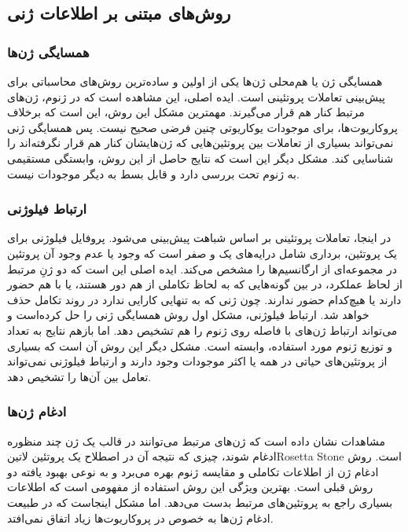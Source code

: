 \subsection{روش‌های مبتنی بر اطلاعات ژنی}
\subsubsection{همسایگی ژن‌ها}
همسایگی ژن یا هم‌محلی ژن‌ها یکی از اولین و ساده‌ترین روش‌های محاسباتی برای پیش‌بینی تعاملات پروتئینی است. ایده اصلی، این مشاهده است که در ژنوم، ژن‌های مرتبط کنار هم قرار می‌گیرند. مهمترین مشکل این روش، این است که برخلاف پروکاریوت‌ها، برای موجودات یوکاریوتی چنین فرضی صحیح نیست. پس همسایگی ژنی نمی‌تواند بسیاری از تعاملات بین پروتئین‌هایی که ژن‌هایشان کنار هم قرار نگرفته‌اند را شناسایی کند. مشکل دیگر این است که نتایج حاصل از این روش، وابستگی مستقیمی به ژنوم تحت بررسی دارد و قابل بسط به دیگر موجودات نیست.

\subsubsection{ارتباط فیلوژنی}
در اینجا، تعاملات پروتئینی بر اساس شباهت  پیش‌بینی می‌شود. پروفایل فیلوژنی برای یک پروتئین، برداری شامل درایه‌های یک و صفر است که وجود یا عدم وجود آن پروتئین در مجموعه‌ای از ارگانسیم‌ها را مشخص می‌کند. ایده اصلی این است که دو ژنِ مرتبط از لحاظ عملکرد، در بین گونه‌هایی که به لحاظ تکاملی از هم دور هستند، یا با هم حضور دارند یا هیچ‌کدام حضور ندارند. چون ژنی که به تنهایی کارایی ندارد در روند تکامل حذف خواهد شد. ارتباط فیلوژنی، مشکل اول روش همسایگی ژنی را حل کرده‌است و می‌تواند ارتباط ژن‌های با فاصله روی ژنوم را هم تشخیص دهد. اما بازهم نتایج به تعداد و توزیع ژنوم مورد استفاده، وابسته است. مشکل دیگر این روش آن است که بسیاری از پروتئین‌های حیاتی در همه یا اکثر موجودات وجود دارند و ارتباط فیلوژنی نمی‌تواند تعامل بین آن‌ها را تشخیص دهد.

\subsubsection{ادغام ژن‌ها}
مشاهدات نشان داده است که ژن‌های مرتبط می‌توانند در قالب یک ژن چند منظوره ادغام شوند، چیزی که نتیجه آن در اصطلاح یک پروتئین ‌لاتین{Rosetta Stone} است. روش ادغام ژن از اطلاعات تکاملی و مقایسه ژنوم بهره می‌برد و به نوعی بهبود یافته دو روش قبلی است. بهترین ویژگی این روش استفاده از مفهومی است که اطلاعات بسیاری راجع به پروتئین‌های مرتبط بدست می‌دهد. اما مشکل اینجاست که در طبیعت ادغام ژن‌ها به خصوص در پروکاریوت‌ها زیاد اتفاق نمی‌افتد.


